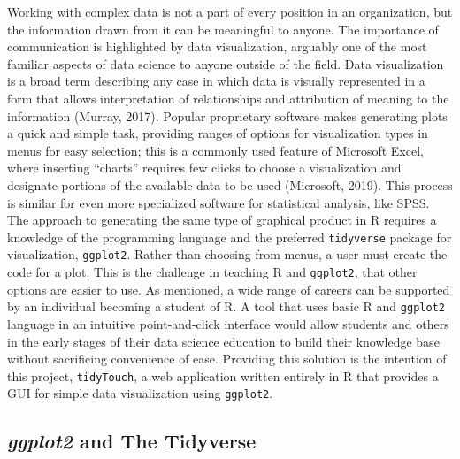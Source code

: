 \documentclass[english,man,floatsintext]{apa6}
\begin{document}
Working with complex data is not a part of every position in an organization, but the information drawn from it can be meaningful to anyone. The importance of communication is highlighted by data visualization, arguably one of the most familiar aspects of data science to anyone outside of the field. Data visualization is a broad term describing any case in which data is visually represented in a form that allows interpretation of relationships and attribution of meaning to the information (Murray, 2017). Popular proprietary software makes generating plots a quick and simple task, providing ranges of options for visualization types in menus for easy selection; this is a commonly used feature of Microsoft Excel, where inserting \enquote{charts} requires few clicks to choose a visualization and designate portions of the available data to be used (Microsoft, 2019). This process is similar for even more specialized software for statistical analysis, like SPSS.\\
The approach to generating the same type of graphical product in R requires a knowledge of the programming language and the preferred \texttt{tidyverse} package for visualization, \texttt{ggplot2}. Rather than choosing from menus, a user must create the code for a plot. This is the challenge in teaching R and \texttt{ggplot2}, that other options are easier to use. As mentioned, a wide range of careers can be supported by an individual becoming a student of R. A tool that uses basic R and \texttt{ggplot2} language in an intuitive point-and-click interface would allow students and others in the early stages of their data science education to build their knowledge base without sacrificing convenience of ease. Providing this solution is the intention of this project, \texttt{tidyTouch}, a web application written entirely in R that provides a GUI for simple data visualization using \texttt{ggplot2}.

\hypertarget{ggplot2-and-the-tidyverse}{%
\subsection{\texorpdfstring{\emph{ggplot2} and The Tidyverse}{ggplot2 and The Tidyverse}}\label{ggplot2-and-the-tidyverse}}
\end{document}
